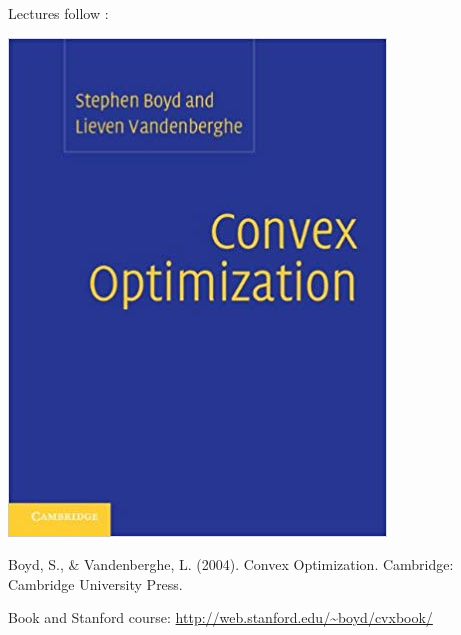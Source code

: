 \hfil\begin{minipage}[t]{0.3\linewidth}
  Lectures follow \cite{Boyd204ConvexOptimization}:

  \bigskip

  \hfil\includegraphics[height=0.5\textheight]{../Graphics/FrontCover1.png}\hfil

  Boyd, S., \& Vandenberghe, L. (2004). Convex Optimization. Cambridge: Cambridge University Press.

  \bigskip

  Book and Stanford course: \url{http://web.stanford.edu/~boyd/cvxbook/}

\end{minipage}\hfil
